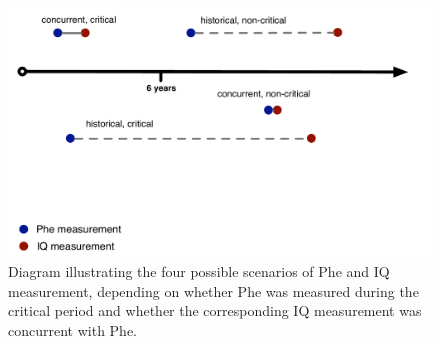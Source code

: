\documentclass{svjour3}                     %
\begin{document}
\begin{figure}[p]


    \includegraphics[width=\textwidth]{measurement.pdf}

    \caption{Diagram illustrating the four possible scenarios of Phe and IQ measurement, depending on whether Phe was measured during the critical period and whether the corresponding IQ measurement was concurrent with Phe.} \label{fig:measurement}

\end{figure}
\end{document}
